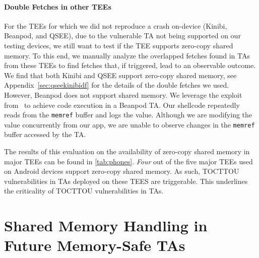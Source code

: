\documentclass[conference]{IEEEtran}
\newcommand{\beanpod}{Beanpod\xspace}
\newcommand{\kinibi}{Kinibi\xspace}
\newcommand{\qsee}{QSEE\xspace}
\begin{document}
\paragraph{Double Fetches in other TEEs}

For the TEEs for which we did not reproduce a crash on-device (\kinibi, \beanpod, and 
\qsee), due to the vulnerable TA not 
being supported on our testing devices, we still want to test if the TEE supports 
zero-copy shared memory. To this end, we manually analyze the overlapped fetches found 
in TAs from these TEEs to find fetches that, if triggered, lead to an observable 
outcome. We find that both \kinibi and \qsee support zero-copy shared memory, see Appendix~\ref{sec:qseekinibidf} 
for the details of the double fetches we used. However, \beanpod does not support 
shared memory. We leverage the exploit from~\cite{globalconfusion} to 
achieve code execution in a \beanpod TA. Our shellcode repeatedly reads from the 
\texttt{memref} buffer and logs the value. Although we are modifying the value concurrently
from our app, we are unable to observe changes in the \texttt{memref} buffer accessed by the TA.

The results of this evaluation on the availability of zero-copy shared memory in major TEEs 
can be found in \autoref{tab:phones}. \emph{Four} out of the five major TEEs used on 
Android devices support zero-copy shared memory. As such, TOCTTOU vulnerabilities in TAs 
deployed on these TEES are triggerable. This underlines the criticality of TOCTTOU 
vulnerabilities in TAs.


\section{Shared Memory Handling in Future Memory-Safe TAs}\label{sec:rusttas}
\end{document}
